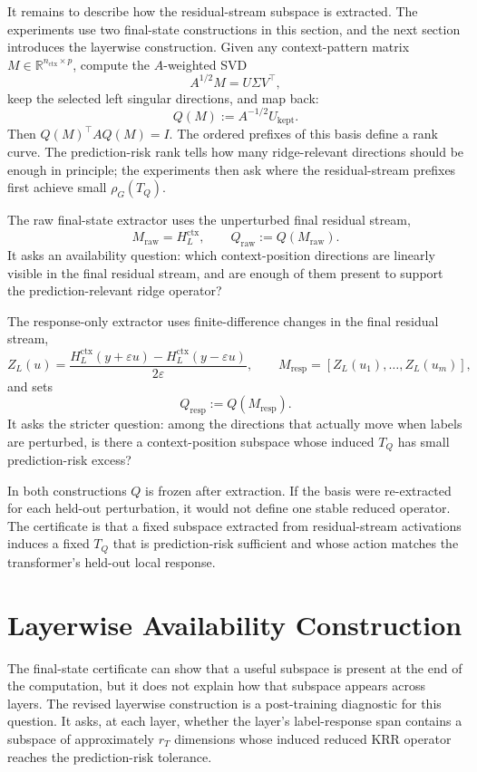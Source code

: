 \documentclass[11pt]{article}
\newcommand{\R}{\mathbb{R}}
\begin{document}
It remains to describe how the residual-stream subspace is extracted. The experiments use two
final-state constructions in this section, and the next section introduces the layerwise
construction. Given any context-pattern
matrix \(M\in\R^{n_{\mathrm{ctx}}\times p}\), compute the \(A\)-weighted SVD
\[
A^{1/2}M=U\Sigma V^\top,
\]
keep the selected left singular directions, and map back:
\[
Q(M):=A^{-1/2}U_{\mathrm{kept}}.
\]
Then \(Q(M)^\top A Q(M)=I\). The ordered prefixes of this basis define a rank curve. The
prediction-risk rank tells how many ridge-relevant directions should be enough in principle; the
experiments then ask where the residual-stream prefixes first achieve small \(\rho_G(T_Q)\).

The raw final-state extractor uses the unperturbed final residual stream,
\[
M_{\mathrm{raw}}=H_L^{\mathrm{ctx}},
\qquad
Q_{\mathrm{raw}}:=Q(M_{\mathrm{raw}}).
\]
It asks an availability question: which context-position directions are linearly visible in the final
residual stream, and are enough of them present to support the prediction-relevant ridge operator?

The response-only extractor uses finite-difference changes in the final residual stream,
\[
Z_L(u)=
\frac{
H_L^{\mathrm{ctx}}(y+\varepsilon u)-H_L^{\mathrm{ctx}}(y-\varepsilon u)
}{2\varepsilon},
\qquad
M_{\mathrm{resp}}=[Z_L(u_1),\ldots,Z_L(u_m)],
\]
and sets
\[
Q_{\mathrm{resp}}:=Q(M_{\mathrm{resp}}).
\]
It asks the stricter question: among the directions that actually move when labels are perturbed,
is there a context-position subspace whose induced \(T_Q\) has small prediction-risk excess?

In both constructions \(Q\) is frozen after extraction. If the basis were re-extracted for each
held-out perturbation, it would not define one stable reduced operator. The certificate is that a
fixed subspace extracted from residual-stream activations induces a fixed \(T_Q\) that is
prediction-risk sufficient and whose action matches the transformer's held-out local response.

\section{Layerwise Availability Construction}

The final-state certificate can show that a useful subspace is present at the end of the computation,
but it does not explain how that subspace appears across layers. The revised layerwise construction
is a post-training diagnostic for this question. It asks, at each layer, whether the layer's
label-response span contains a subspace of approximately \(r_T\) dimensions whose induced reduced
KRR operator reaches the prediction-risk tolerance.
\end{document}
